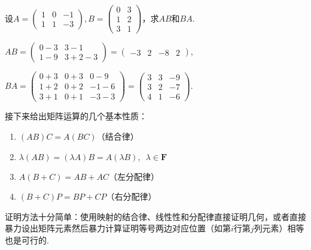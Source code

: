\begin{example}{}{}
    设$A=\begin{pmatrix}
            1 & 0 & -1 \\
            1 & 1 & -3
        \end{pmatrix}, B=\begin{pmatrix}
            0 & 3 \\
            1 & 2 \\
            3 & 1
        \end{pmatrix}$，求$AB$和$BA$.
\end{example}

\begin{solution}
    $AB =\begin{pmatrix}
            0-3 & 3-1   \\
            1-9 & 3+2-3
        \end{pmatrix}=\begin{pmatrix}
            -3 & 2 & -8 & 2
        \end{pmatrix}$,

    $BA=\begin{pmatrix}
            0+3 & 0+3 & 0-9  \\
            1+2 & 0+2 & -1-6 \\
            3+1 & 0+1 & -3-3
        \end{pmatrix}=\begin{pmatrix}
            3 & 3 & -9 \\
            3 & 2 & -7 \\
            4 & 1 & -6
        \end{pmatrix}$.
\end{solution}

接下来给出矩阵运算的几个基本性质：
\begin{enumerate}
    \item $(AB)C=A(BC)$（结合律）

    \item $\lambda(AB)=(\lambda A)B=A(\lambda B),\enspace \lambda \in \mathbf{F}$

    \item $A(B+C)=AB+AC$（左分配律）

    \item $(B+C)P=BP+CP$（右分配律）
\end{enumerate}
证明方法十分简单：使用映射的结合律、线性性和分配律直接证明几何，或者直接暴力设出矩阵元素然后暴力计算证明等号两边对应位置（如第$i$行第$j$列元素）相等也是可行的.

